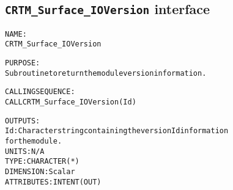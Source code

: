 \subsection{\texttt{CRTM\_Surface\_IOVersion} interface}
  \label{sec:CRTM_Surface_IOVersion_interface}
  \begin{alltt}
 
  NAME:
        CRTM_Surface_IOVersion
 
  PURPOSE:
        Subroutine to return the module version information.
 
  CALLING SEQUENCE:
        CALL CRTM_Surface_IOVersion( Id )
 
  OUTPUTS:
        Id:            Character string containing the version Id information
                       for the module.
                       UNITS:      N/A
                       TYPE:       CHARACTER(*)
                       DIMENSION:  Scalar
                       ATTRIBUTES: INTENT(OUT)
 
  \end{alltt}
